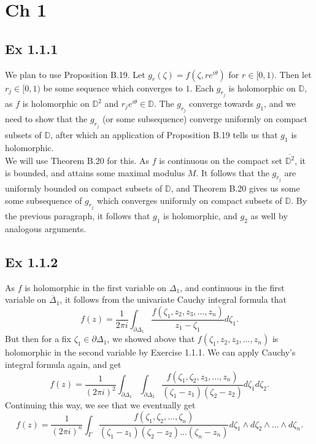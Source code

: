 \documentclass{article}
\theoremstyle{definition}
\newcommand{\D}{\mathbb{D}}
\begin{document}
\section*{Ch 1}

\subsection*{Ex 1.1.1}

We plan to use Proposition B.19. Let $g_{r}(\zeta) = f(\zeta, re^{i\theta})$ for
$r \in [0, 1)$. Then let $r_j \in [0, 1)$ be some sequence which converges to
$1$. Each $g_{r_j}$ is holomorphic on $\D$, as $f$ is holomorphic on $\D^{2}$
and $r_j e^{i \theta} \in \D$. The $g_{r_j}$ converge towards $g_1$, and we
need to show that the $g_{r_j}$ (or some subsequence) converge uniformly on
compact subsets of $\D$, after which an application of Proposition B.19 tells
us that $g_1$ is holomorphic. \\

We will use Theorem B.20 for this. As $f$ is continuous on the compact set
$\overline{\D^{2}}$, it is bounded, and attains some maximal modulus $M$. It
follows that the $g_{r_j}$ are uniformly bounded on compact subsets of $\D$,
and Theorem B.20 gives us some some subsequence of $g_{r_j}$ which converges
uniformly on compact subsets of $\D$. By the previous paragraph, it follows
that $g_1$ is holomorphic, and $g_2$ as well by analogous arguments.

\subsection*{Ex 1.1.2}

As $f$ is holomorphic in the first variable on $\Delta_1$, and continuous in
the first variable on $\overline{\Delta}_1$, it follows from the univariate
Cauchy integral formula that
\[
	f(z)
	=
	\frac{1}{2\pi i}
	\int_{\partial \Delta_1}
	\frac{f(\zeta_1, z_2, z_3, \ldots, z_n)}{z_1 - \zeta_1} d\zeta_1.
\] 
But then for a fix $\zeta_1 \in \partial \Delta_1$, we showed above that
$f(\zeta_1, z_2, z_3, \ldots, z_n)$ is holomorphic in the second variable by
Exercise 1.1.1. We can apply Cauchy's integral formula again, and get
\[
	f(z)
	=
	\frac{1}{(2\pi i)^2}
	\int_{\partial \Delta_1}
	\int_{\partial \Delta_2}
	\frac{f(\zeta_1, \zeta_2, z_3, \ldots, z_n)}{(\zeta_1 - z_1)(\zeta_2 - z_2)} d\zeta_1 d\zeta_2.
\]
Continuing this way, we see that we eventually get 
\[
	f(z)
	=
	\frac{1}{(2\pi i)^n}
	\int_{\Gamma}
	\frac{f(\zeta_1, \zeta_2, \ldots, \zeta_n)}{(\zeta_1 - z_1)(\zeta_2 - z_2) \ldots (\zeta_n - z_n)}
	d\zeta_1 \wedge d\zeta_2 \wedge \ldots \wedge d\zeta_n.
\]
\end{document}
